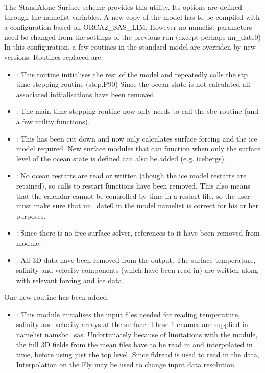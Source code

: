 \documentclass[NEMO_book]{subfiles}
\begin{document}
The StandAlone Surface scheme provides this utility.
Its options are defined through the  namelist variables.
A new copy of the model has to be compiled with a configuration based on ORCA2\_SAS\_LIM.
However no namelist parameters need be changed from the settings of the previous run (except perhaps nn{\_}date0)
In this configuration, a few routines in the standard model are overriden by new versions.
Routines replaced are:

\begin{itemize}
\item {} : This routine initialises the rest of the model and repeatedly calls the stp time stepping routine (step.F90)
       Since the ocean state is not calculated all associated initialisations have been removed.
\item  {} : The main time stepping routine now only needs to call the sbc routine (and a few utility functions).
\item  {} : This has been cut down and now only calculates surface forcing and the ice model required.  New surface modules
       that can function when only the surface level of the ocean state is defined can also be added (e.g. icebergs).
\item  {} : No ocean restarts are read or written (though the ice model restarts are retained), so calls to restart functions
       have been removed.  This also means that the calendar cannot be controlled by time in a restart file, so the user
       must make sure that nn{\_}date0 in the model namelist is correct for his or her purposes.
\item  {} : Since there is no free surface solver, references to it have been removed from  module.
\item  {} : All 3D data have been removed from the output.  The surface temperature, salinity and velocity components (which
       have been read in) are written along with relevant forcing and ice data.
\end{itemize}

One new routine has been added:

\begin{itemize}
\item  {} : This module initialises the input files needed for reading temperature, salinity and velocity arrays at the surface.
       These filenames are supplied in namelist namsbc{\_}sas.  Unfortunately because of limitations with the  module,
       the full 3D fields from the mean files have to be read in and interpolated in time, before using just the top level.
       Since fldread is used to read in the data, Interpolation on the Fly may be used to change input data resolution.
\end{itemize}
\end{document}
